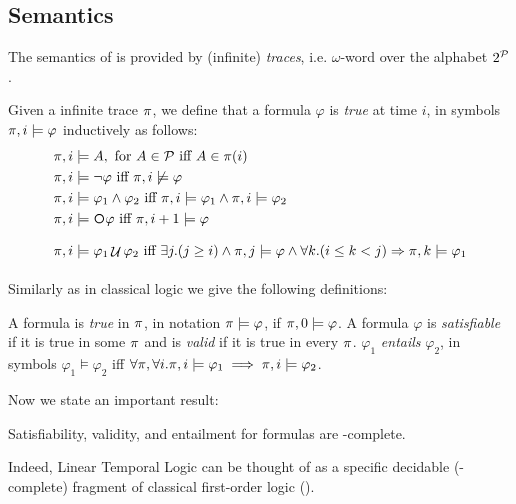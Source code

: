 \subsection{Semantics}\label{ltl-semantics}
The semantics of \LTL is provided by (infinite) \textit{traces}, i.e. $\omega$-word over the alphabet $2^{\mathcal{P}}$.  


\begin{definition}\label{ltl-satisfaction}
	Given a infinite trace $\pi$, we define that a \LTL formula $\varphi$ is \emph{true} at time $i$, in symbols $\pi, i \models \varphi$ inductively as follows:
	\begin{align*}
	\trace, i &\models A, \tm{for} A\in\Prop \tiff A \in \trace(i)\\
	\trace, i &\models \lnot \varphi \tiff \trace, i \not\models \varphi\\
	\trace, i &\models \varphi_1 \lAND \varphi_2 \tiff \trace, i \models \varphi_1 \lAND \trace, i \models \varphi_2\\
	\trace, i &\models \Next\varphi \tiff \trace,i+1 \models \varphi\\
	\trace, i &\models \varphi_1 \lUntil \varphi_2 \tiff \exists j. (j\ge i) \lAND \trace,j \models \varphi \lAND\forall k. (i\le k < j) \Rightarrow \trace, k \models \varphi_1\\
	\end{align*}
\end{definition}
Similarly as in classical logic we give the following definitions:
\begin{definition}\label{ltl-sat-val-ent}
	A \LTL formula is \emph{true} in $\pi$, in notation $\pi \models \varphi$, if $\pi, 0 \models \varphi$. A formula $\varphi$ is \emph{satisfiable} if it is true in some $\pi$ and is \emph{valid} if it is true in every $\pi$. $\varphi_1$ \emph{entails} $\varphi_2$, in symbols $\varphi_1 \models \varphi_2$ iff $\forall \pi, \forall i.\pi, i \models \varphi_1 \implies \pi, i \models \varphi_2$.
\end{definition}

Now we state an important result:
\begin{theorem}
	Satisfiability, validity, and entailment for \LTL formulas are \PSPACE-complete.
\end{theorem}
Indeed, Linear Temporal Logic can be thought of as a specific decidable (\PSPACE-complete) fragment of classical first-order logic (\FOL).

